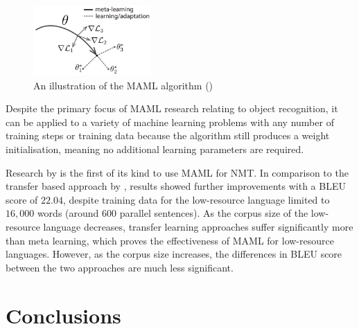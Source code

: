 \begin{figure}[ht!]
\centering
\includegraphics[width=0.40\textwidth]{media/literature/nmt_approaches/maml.png}
\caption[Diagram of a \gls{MAML} algorithm]{An illustration of the \Gls{MAML} algorithm (\cite{finn_model-agnostic_2017})}
\label{fig:MAML}
\end{figure}

Despite the primary focus of \acrshort{MAML} research relating to object recognition, it can be applied to a variety of machine learning problems with any number of training steps or training data because the algorithm still produces a weight initialisation, meaning no additional learning parameters are required.



%
%

Research by \cite{gu_meta-learning_2018} is the first of its kind to use \acrshort{MAML} for \acrshort{NMT}. In comparison to the transfer based approach by \cite{zoph_transfer_2016}, results showed further improvements with a BLEU score of $22.04$, despite training data for the low-resource language limited to $16,000$ words (around $600$ parallel sentences). As the corpus size of the low-resource language decreases, transfer learning approaches suffer significantly more than meta learning, which proves the effectiveness of \acrshort{MAML} for low-resource languages. However, as the corpus size increases, the differences in BLEU score between the two approaches are much less significant.

\section{Conclusions}

